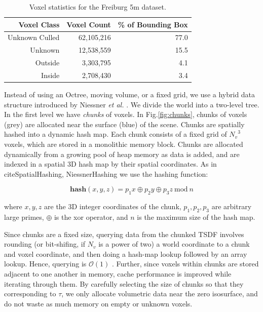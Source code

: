 \documentclass[conference]{IEEEtran}
\newcommand{\figref}[1]{Fig.\ref{#1}}
\newcommand{\etal}{\textit{et al. }}
\begin{document}
\begin{table}[t!]
\centering
	\begin{tabular} {rrr}
	\toprule
	Voxel Class & Voxel Count & \% of Bounding Box \\ 
	\midrule
	Unknown Culled & 62,105,216 & 77.0 \\ 
	Unknown & 12,538,559 & 15.5 \\ 
	Outside & 3,303,795 & 4.1 \\ 
	Inside & 2,708,430 & 3.4 \\ 
	\bottomrule
	\end{tabular}
	\caption{Voxel statistics for the Freiburg 5m dataset.}
	\label{table:volumecount}  
\end{table}

Instead of using an Octree, moving volume, or a fixed grid, we use a hybrid data
structure introduced by Niessner \etal \cite{NiessnerHashing}. We divide
the world into a two-level tree. In the first level we have \emph{chunks} of
voxels.  In \figref{fig:chunks}, chunks of voxels (grey) are allocated near the
surface (blue) of the scene. Chunks are spatially hashed \cite{SpatialHashing}
into a dynamic hash map.  Each chunk consists of a fixed grid of ${N_v}^3$
voxels, which are stored in a monolithic memory block. Chunks are allocated
dynamically from a growing pool of heap memory as data is added, and are
indexed in a spatial 3D hash map \cite{SpatialHashing} by their spatial
coordinates. As in cite{SpatialHashing, NiessnerHashing} we use the hashing
function:

\begin{equation}
\textbf{hash}(x, y, z) = p_1 x\oplus p_2 y \oplus p_3 z
~\text{mod}~n
\end{equation}

\noindent where $x, y, z$ are the 3D integer coordinates of the chunk, $p_1,
p_2, p_3$ are arbitrary large primes, $\oplus$ is the xor operator, and $n$ is
the maximum size of the hash map.

Since chunks are a fixed size, querying data from the chunked TSDF involves
rounding (or bit-shifing, if $N_v$ is a power of two) a world coordinate to a
chunk and voxel coordinate, and then doing a hash-map lookup followed by an
array lookup. Hence, querying is $\mathcal{O}(1)$ \cite{NiessnerHashing}.
Further, since voxels within chunks are stored adjacent to one another in
memory, cache performance is improved while iterating through them. By carefully
selecting the size of chunks so that they corresponding to $\tau$, we only
allocate volumetric data near the zero isosurface, and do not waste as much
memory on empty or unknown voxels.
\end{document}
